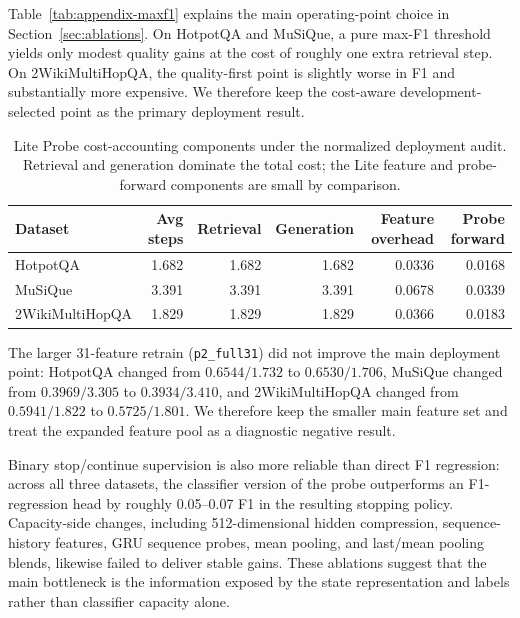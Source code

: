 \documentclass{article}
\newcommand{\hotpot}{HotpotQA}
\newcommand{\musique}{MuSiQue}
\newcommand{\twowiki}{2WikiMultiHopQA}
\begin{document}
Table~\ref{tab:appendix-maxf1} explains the main operating-point choice in Section~\ref{sec:ablations}. On \hotpot{} and \musique{}, a pure max-F1 threshold yields only modest quality gains at the cost of roughly one extra retrieval step. On \twowiki{}, the quality-first point is slightly worse in F1 and substantially more expensive. We therefore keep the cost-aware development-selected point as the primary deployment result.

\begin{table}[htbp]
  \caption{Lite Probe cost-accounting components under the normalized deployment audit. Retrieval and generation dominate the total cost; the Lite feature and probe-forward components are small by comparison.}
  \label{tab:appendix-lite-components}
  \centering
  \small
  \begin{tabular}{lrrrrr}
    \toprule
    Dataset & Avg steps & Retrieval & Generation & Feature overhead & Probe forward \\
    \midrule
    \hotpot{} & 1.682 & 1.682 & 1.682 & 0.0336 & 0.0168 \\
    \musique{} & 3.391 & 3.391 & 3.391 & 0.0678 & 0.0339 \\
    \twowiki{} & 1.829 & 1.829 & 1.829 & 0.0366 & 0.0183 \\
    \bottomrule
  \end{tabular}
\end{table}

The larger 31-feature retrain (\texttt{p2\_full31}) did not improve the main deployment point: \hotpot{} changed from $0.6544/1.732$ to $0.6530/1.706$, \musique{} changed from $0.3969/3.305$ to $0.3934/3.410$, and \twowiki{} changed from $0.5941/1.822$ to $0.5725/1.801$. We therefore keep the smaller main feature set and treat the expanded feature pool as a diagnostic negative result.

Binary stop/continue supervision is also more reliable than direct F1 regression: across all three datasets, the classifier version of the probe outperforms an F1-regression head by roughly 0.05--0.07 F1 in the resulting stopping policy. Capacity-side changes, including 512-dimensional hidden compression, sequence-history features, GRU sequence probes, mean pooling, and last/mean pooling blends, likewise failed to deliver stable gains. These ablations suggest that the main bottleneck is the information exposed by the state representation and labels rather than classifier capacity alone.
\end{document}
